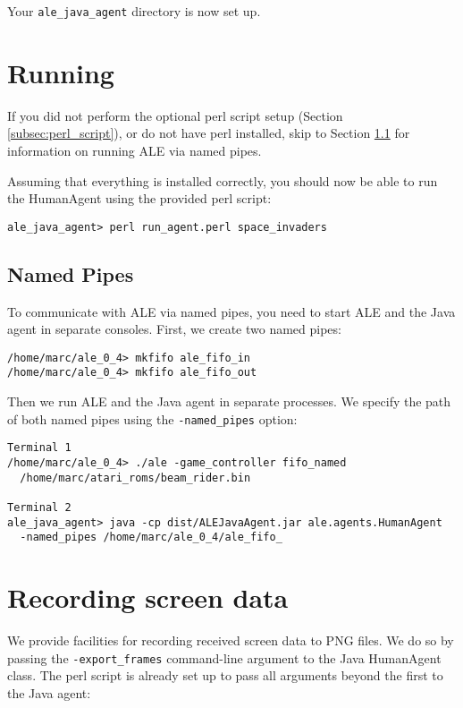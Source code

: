 \documentclass[12pt]{article}
\begin{document}
Your \verb+ale_java_agent+ directory is now set up.

\section{Running}

If you did not perform the optional perl script setup (Section 
\ref{subsec:perl_script}), or do not have perl installed, skip to Section 
\ref{subsec:named_pipes} for information on running ALE via named pipes.

Assuming that everything is installed correctly, you should now be able to
run the HumanAgent using the provided perl script:

\begin{verbatim}
ale_java_agent> perl run_agent.perl space_invaders 
\end{verbatim}

\subsection{Named Pipes}\label{subsec:named_pipes}

To communicate with ALE via named pipes, you need to start ALE and the Java
agent in separate consoles. First, we create two named pipes:

\begin{verbatim}
/home/marc/ale_0_4> mkfifo ale_fifo_in
/home/marc/ale_0_4> mkfifo ale_fifo_out
\end{verbatim}

Then we run ALE and the Java agent in separate processes. We specify the path
of both named pipes using the \verb+-named_pipes+ option:

\begin{verbatim}
Terminal 1
/home/marc/ale_0_4> ./ale -game_controller fifo_named 
  /home/marc/atari_roms/beam_rider.bin

Terminal 2
ale_java_agent> java -cp dist/ALEJavaAgent.jar ale.agents.HumanAgent 
  -named_pipes /home/marc/ale_0_4/ale_fifo_
\end{verbatim}

\section{Recording screen data}

We provide facilities for recording received screen data to PNG files. We do
so by passing the \verb+-export_frames+ command-line argument to the Java
HumanAgent class. The perl script is already set up to pass all arguments 
beyond the first to the Java agent:
\end{document}
